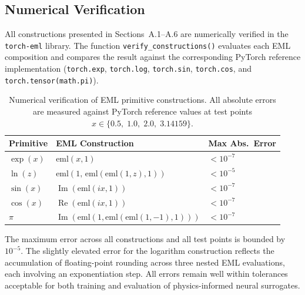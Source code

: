 \subsection{Numerical Verification}
\label{sec:numerical-verification}

All constructions presented in Sections~A.1--A.6 are numerically verified in the \texttt{torch-eml} library.  The function \texttt{verify\_constructions()} evaluates each EML composition and compares the result against the corresponding PyTorch reference implementation (\texttt{torch.exp}, \texttt{torch.log}, \texttt{torch.sin}, \texttt{torch.cos}, and \texttt{torch.tensor(math.pi)}).

\begin{table}[h]
\centering
\caption{Numerical verification of EML primitive constructions.  All absolute errors are measured against PyTorch reference values at test points $x \in \{0.5,\; 1.0,\; 2.0,\; 3.14159\}$.}
\label{tab:verification}
\begin{tabular}{lll}
\toprule
\textbf{Primitive} & \textbf{EML Construction} & \textbf{Max Abs.\ Error} \\
\midrule
$\exp(x)$ & $\mathrm{eml}(x, 1)$ & $< 10^{-7}$ \\
$\ln(z)$  & $\mathrm{eml}(1,\, \mathrm{eml}(\mathrm{eml}(1, z), 1))$ & $< 10^{-5}$ \\
$\sin(x)$ & $\operatorname{Im}(\mathrm{eml}(ix, 1))$ & $< 10^{-7}$ \\
$\cos(x)$ & $\operatorname{Re}(\mathrm{eml}(ix, 1))$ & $< 10^{-7}$ \\
$\pi$     & $\operatorname{Im}(\mathrm{eml}(1, \mathrm{eml}(\mathrm{eml}(1, -1), 1)))$ & $< 10^{-7}$ \\
\bottomrule
\end{tabular}
\end{table}

\noindent The maximum error across all constructions and all test points is bounded by $10^{-5}$.  The slightly elevated error for the logarithm construction reflects the accumulation of floating-point rounding across three nested EML evaluations, each involving an exponentiation step.  All errors remain well within tolerances acceptable for both training and evaluation of physics-informed neural surrogates.
